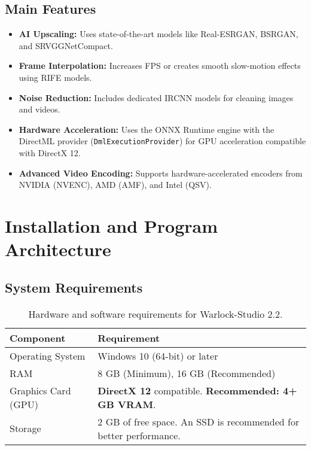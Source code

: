 \documentclass[11pt, a4paper]{article}
\begin{document}
\subsection{Main Features}
\begin{itemize}[leftmargin=*]
    \item \textbf{AI Upscaling:} Uses state-of-the-art models like Real-ESRGAN, BSRGAN, and SRVGGNetCompact.
    \item \textbf{Frame Interpolation:} Increases FPS or creates smooth slow-motion effects using RIFE models.
    \item \textbf{Noise Reduction:} Includes dedicated IRCNN models for cleaning images and videos.
    \item \textbf{Hardware Acceleration:} Uses the ONNX Runtime engine with the DirectML provider (\texttt{DmlExecutionProvider}) for GPU acceleration compatible with DirectX 12.
    \item \textbf{Advanced Video Encoding:} Supports hardware-accelerated encoders from NVIDIA (NVENC), AMD (AMF), and Intel (QSV).
\end{itemize}


\section{Installation and Program Architecture}

\subsection{System Requirements}
\begin{table}[H]
    \centering %
    \begin{tabular}{ll}
        \toprule %
        \textbf{Component} & \textbf{Requirement} \\
        \midrule %
        Operating System & Windows 10 (64-bit) or later \\
        RAM & 8 GB (Minimum), 16 GB (Recommended) \\
        Graphics Card (GPU) & \textbf{DirectX 12} compatible. \textbf{Recommended: 4+ GB VRAM}. \\
        Storage & 2 GB of free space. An SSD is recommended for better performance. \\
        \bottomrule %
    \end{tabular}
    \caption{Hardware and software requirements for Warlock-Studio 2.2.}
\end{table}
\end{document}
